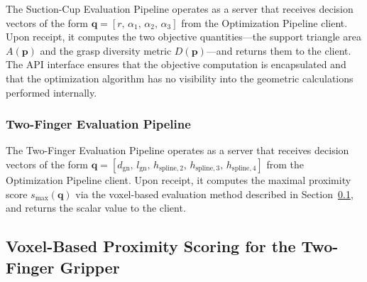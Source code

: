 The Suction-Cup Evaluation Pipeline
operates as a server that receives decision vectors of the form
$\mathbf{q} = [r,\, \alpha_1,\, \alpha_2,\, \alpha_3]$ from the Optimization
Pipeline client. Upon receipt, it computes the two objective quantities---the
support triangle area $A(\mathbf{p})$ and the grasp diversity metric
$D(\mathbf{p})$---and returns them to the client. The API interface ensures
that the objective computation is encapsulated and that the optimization
algorithm has no visibility into the geometric calculations performed internally.

\subsubsection{Two-Finger Evaluation Pipeline}
\label{subsec:methodology_tf_pipeline}

The Two-Finger Evaluation Pipeline operates as a server that receives
decision vectors of the form
$\mathbf{q} = [d_{\mathrm{gn}},\, l_{\mathrm{gn}},\,
h_{\mathrm{spline},2},\, h_{\mathrm{spline},3},\, h_{\mathrm{spline},4}]$
from the Optimization Pipeline client. Upon receipt, it computes the maximal
proximity score $s_{\max}(\mathbf{q})$ via the voxel-based evaluation method
described in Section~\ref{subsec:methodology_voxel}, and returns the scalar
value to the client.


\subsection{Voxel-Based Proximity Scoring for the Two-Finger Gripper}
\label{subsec:methodology_voxel}

